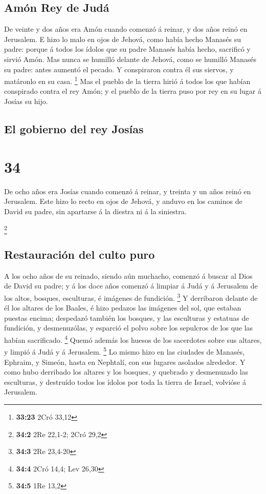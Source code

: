 \hypertarget{amuxf3n-rey-de-juduxe1}{%
\subsection{Amón Rey de Judá}\label{amuxf3n-rey-de-juduxe1}}

 De veinte y dos años era Amón cuando comenzó á reinar, y
dos años reinó en Jerusalem.  E hizo lo malo en ojos de
Jehová, como había hecho Manasés su padre: porque á todos los ídolos que
su padre Manasés había hecho, sacrificó y sirvió Amón.  Mas
nunca se humilló delante de Jehová, como se humilló Manasés su padre:
antes aumentó el pecado.  Y conspiraron contra él sus
siervos, y matáronlo en su casa. \footnote{\textbf{33:23} 2Cró 33,12}
 Mas el pueblo de la tierra hirió á todos los que habían
conspirado contra el rey Amón; y el pueblo de la tierra puso por rey en
su lugar á Josías su hijo. 

\hypertarget{el-gobierno-del-rey-josuxedas}{%
\subsection{El gobierno del rey
Josías}\label{el-gobierno-del-rey-josuxedas}}

\hypertarget{section-33}{%
\section{34}\label{section-33}}

 De ocho años era Josías cuando comenzó á reinar, y treinta
y un años reinó en Jerusalem.  Este hizo lo recto en ojos de
Jehová, y anduvo en los caminos de David su padre, sin apartarse á la
diestra ni á la siniestra.

\footnote{\textbf{34:2} 2Re 22,1-2; 2Cró 29,2}

\hypertarget{restauraciuxf3n-del-culto-puro}{%
\subsection{Restauración del culto
puro}\label{restauraciuxf3n-del-culto-puro}}

 A los ocho años de su reinado, siendo aún muchacho, comenzó
á buscar al Dios de David su padre; y á los doce años comenzó á limpiar
á Judá y á Jerusalem de los altos, bosques, esculturas, é imágenes de
fundición. \footnote{\textbf{34:3} 2Re 23,4-20}  Y
derribaron delante de él los altares de los Baales, é hizo pedazos las
imágenes del sol, que estaban puestas encima; despedazó también los
bosques, y las esculturas y estatuas de fundición, y desmenuzólas, y
esparció el polvo sobre los sepulcros de los que las habían sacrificado.
\footnote{\textbf{34:4} 2Cró 14,4; Lev 26,30}  Quemó además
los huesos de los sacerdotes sobre sus altares, y limpió á Judá y á
Jerusalem. \footnote{\textbf{34:5} 1Re 13,2}  Lo mismo hizo
en las ciudades de Manasés, Ephraim, y Simeón, hasta en Nephtalí, con
sus lugares asolados alrededor.  Y como hubo derribado los
altares y los bosques, y quebrado y desmenuzado las esculturas, y
destruído todos los ídolos por toda la tierra de Israel, volvióse á
Jerusalem.

